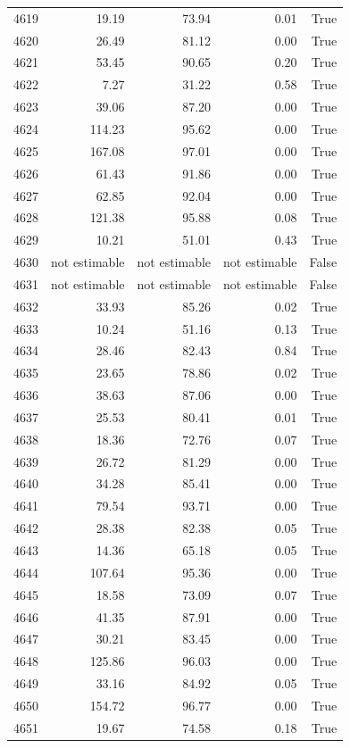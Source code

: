 \begin{longtable}{rrrrr}
4619 & 19.19 & 73.94 & 0.01 & True \\
4620 & 26.49 & 81.12 & 0.00 & True \\
4621 & 53.45 & 90.65 & 0.20 & True \\
4622 & 7.27 & 31.22 & 0.58 & True \\
4623 & 39.06 & 87.20 & 0.00 & True \\
4624 & 114.23 & 95.62 & 0.00 & True \\
4625 & 167.08 & 97.01 & 0.00 & True \\
4626 & 61.43 & 91.86 & 0.00 & True \\
4627 & 62.85 & 92.04 & 0.00 & True \\
4628 & 121.38 & 95.88 & 0.08 & True \\
4629 & 10.21 & 51.01 & 0.43 & True \\
4630 & not estimable & not estimable & not estimable & False \\
4631 & not estimable & not estimable & not estimable & False \\
4632 & 33.93 & 85.26 & 0.02 & True \\
4633 & 10.24 & 51.16 & 0.13 & True \\
4634 & 28.46 & 82.43 & 0.84 & True \\
4635 & 23.65 & 78.86 & 0.02 & True \\
4636 & 38.63 & 87.06 & 0.00 & True \\
4637 & 25.53 & 80.41 & 0.01 & True \\
4638 & 18.36 & 72.76 & 0.07 & True \\
4639 & 26.72 & 81.29 & 0.00 & True \\
4640 & 34.28 & 85.41 & 0.00 & True \\
4641 & 79.54 & 93.71 & 0.00 & True \\
4642 & 28.38 & 82.38 & 0.05 & True \\
4643 & 14.36 & 65.18 & 0.05 & True \\
4644 & 107.64 & 95.36 & 0.00 & True \\
4645 & 18.58 & 73.09 & 0.07 & True \\
4646 & 41.35 & 87.91 & 0.00 & True \\
4647 & 30.21 & 83.45 & 0.00 & True \\
4648 & 125.86 & 96.03 & 0.00 & True \\
4649 & 33.16 & 84.92 & 0.05 & True \\
4650 & 154.72 & 96.77 & 0.00 & True \\
4651 & 19.67 & 74.58 & 0.18 & True \\

\end{longtable}
